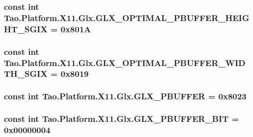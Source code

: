 \label{class_tao_1_1_platform_1_1_x11_1_1_glx_ab4845c9111062972b88a73f6115539a8}
\hypertarget{class_tao_1_1_platform_1_1_x11_1_1_glx_af47ec9964a832b5f77fb66616d845771}{
\subsubsection[{GLX\_\-OPTIMAL\_\-PBUFFER\_\-HEIGHT\_\-SGIX}]{\setlength{\rightskip}{0pt plus 5cm}const int {\bf Tao.Platform.X11.Glx.GLX\_\-OPTIMAL\_\-PBUFFER\_\-HEIGHT\_\-SGIX} = 0x801A}}
\label{class_tao_1_1_platform_1_1_x11_1_1_glx_af47ec9964a832b5f77fb66616d845771}
\hypertarget{class_tao_1_1_platform_1_1_x11_1_1_glx_ab87b4beadb6382fd25ce4f4f320055a9}{
\subsubsection[{GLX\_\-OPTIMAL\_\-PBUFFER\_\-WIDTH\_\-SGIX}]{\setlength{\rightskip}{0pt plus 5cm}const int {\bf Tao.Platform.X11.Glx.GLX\_\-OPTIMAL\_\-PBUFFER\_\-WIDTH\_\-SGIX} = 0x8019}}
\label{class_tao_1_1_platform_1_1_x11_1_1_glx_ab87b4beadb6382fd25ce4f4f320055a9}
\hypertarget{class_tao_1_1_platform_1_1_x11_1_1_glx_a2fc2a28bd00b531b96e0041cbdeef3c3}{
\subsubsection[{GLX\_\-PBUFFER}]{\setlength{\rightskip}{0pt plus 5cm}const int {\bf Tao.Platform.X11.Glx.GLX\_\-PBUFFER} = 0x8023}}
\label{class_tao_1_1_platform_1_1_x11_1_1_glx_a2fc2a28bd00b531b96e0041cbdeef3c3}
\hypertarget{class_tao_1_1_platform_1_1_x11_1_1_glx_a64b5d49bef52b11f4ad5bd1ef90e84ca}{
\subsubsection[{GLX\_\-PBUFFER\_\-BIT}]{\setlength{\rightskip}{0pt plus 5cm}const int {\bf Tao.Platform.X11.Glx.GLX\_\-PBUFFER\_\-BIT} = 0x00000004}}
